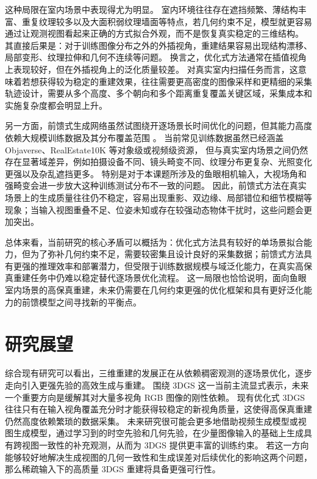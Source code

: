 这种局限在室内场景中表现得尤为明显。
室内环境往往存在遮挡频繁、薄结构丰富、重复纹理较多以及大面积弱纹理墙面等特点，若几何约束不足，模型就更容易通过让观测视图看起来正确的方式拟合外观，而不是恢复真实稳定的三维结构。
其直接后果是：对于训练图像分布之外的外插视角，重建结果容易出现结构漂移、局部变形、纹理拉伸和几何不连续等问题。
换言之，优化式方法通常在插值视角上表现较好，但在外插视角上的泛化质量较差。
对真实室内扫描任务而言，这意味着若想获得较为稳定的重建效果，往往需要更高密度的图像采样和更精细的采集轨迹设计，需要从多个高度、多个朝向和多个距离重复覆盖关键区域，采集成本和实施复杂度都会明显上升。

另一方面，前馈式生成网络虽然试图绕开逐场景长时间优化的问题，但其能力高度依赖大规模训练数据及其分布覆盖范围 \cite{zhang2024gslrm,smart2024splatt3r,ye2024noposplat,kang2025selfsplat}。
当前常见训练数据虽然已经涵盖 Objaverse、RealEstate10K 等对象级或视频级资源，
但与真实室内场景之间仍然存在显著域差异，例如拍摄设备不同、镜头畸变不同、纹理分布更复杂、光照变化更强以及杂乱遮挡更多。
特别是对于本课题所涉及的鱼眼相机输入，大视场角和强畸变会进一步放大这种训练测试分布不一致的问题。
因此，前馈式方法在真实场景上的生成质量往往仍不稳定，容易出现重影、双边缘、局部错位和细节模糊等现象；当输入视图重叠不足、位姿未知或存在较强动态物体干扰时，这些问题会更加突出。

总体来看，当前研究的核心矛盾可以概括为：优化式方法具有较好的单场景拟合能力，但为了弥补几何约束不足，需要较密集且设计良好的采集数据；前馈式方法具有更强的推理效率和部署潜力，但受限于训练数据规模与域泛化能力，在真实高保真重建任务中仍难以稳定替代逐场景优化流程。
这一局限也恰恰说明，面向鱼眼室内场景的高保真重建，未来仍需要在几何约束更强的优化框架和具有更好泛化能力的前馈模型之间寻找新的平衡点。

\section{研究展望}

综合现有研究可以看出，三维重建的发展正在从依赖稠密观测的逐场景优化，逐步走向引入更强先验的高效生成与重建。
围绕 3DGS 这一当前主流显式表示，未来一个重要方向是缓解其对大量多视角 RGB 图像的刚性依赖。
现有优化式 3DGS 往往只有在输入视角覆盖充分时才能获得较稳定的新视角质量，这使得高保真重建仍然高度依赖繁琐的数据采集。
未来研究很可能会更多地借助视频生成模型或视图生成模型，通过学习到的时空先验和几何先验，在少量图像输入的基础上生成具有跨视图一致性的补充观测，从而为 3DGS 提供更丰富的训练约束。
若这一方向能够较好地解决生成视图的几何一致性和生成误差对后续优化的影响这两个问题，那么稀疏输入下的高质量 3DGS 重建将具备更强可行性。

